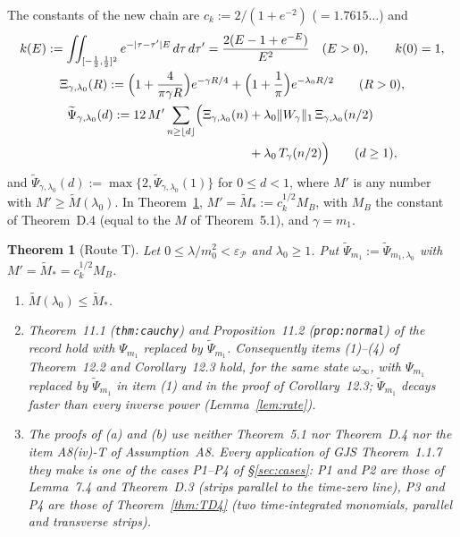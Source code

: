 \documentclass[11pt,a4paper]{article}
\newcommand{\Mt}{\widetilde M}                %
\newcommand{\Psit}{\widetilde\Psi}
\theoremstyle{plain}
\newtheorem{ttheorem}[tlemma]{Theorem}
\theoremstyle{definition}
\begin{document}
The constants of the new chain are $c_k:=2/(1+e^{-2})$ ($=1.7615\ldots$) and
\begin{gather}
 k(E):=\iint_{[-\frac12,\frac12]^2}e^{-|\tau-\tau'|E}\,d\tau\,d\tau'
 =\frac{2(E-1+e^{-E})}{E^2}\quad(E>0),\qquad k(0)=1,\label{eq:k}\\
 \Xi_{\gamma,\lambda_0}(R):=\Bigl(1+\frac{4}{\pi\gamma R}\Bigr)e^{-\gamma R/4}
 +\Bigl(1+\frac1\pi\Bigr)e^{-\lambda_0R/2}\qquad(R>0),\label{eq:Xi}\\
 \begin{split}
 \Psit_{\gamma,\lambda_0}(d):=12\,M'\sum_{n\ge\lfloor d\rfloor}\Bigl(\Xi_{\gamma,\lambda_0}(n)
 &+\lambda_0\|W_\gamma\|_1\,\Xi_{\gamma,\lambda_0}(n/2)\\
 &+\lambda_0\,T_\gamma(n/2)\Bigr)\qquad(d\ge1),
 \end{split}\label{eq:Psit}
\end{gather}
and $\Psit_{\gamma,\lambda_0}(d):=\max\{2,\Psit_{\gamma,\lambda_0}(1)\}$ for $0\le d<1$, where
$M'$ is any number with $M'\ge\Mt(\lambda_0)$.  In Theorem~\ref{thm:routeT},
$M'=\Mt_*:=c_k^{1/2}M_B$, with $M_B$ the constant of Theorem~D.4 (equal to the $M$ of
Theorem~5.1), and $\gamma=m_1$.

\begin{ttheorem}[Route T]\label{thm:routeT}
Let $0\le\lambda/m_0^2<\varepsilon_{\mathscr P}$ and $\lambda_0\ge1$.  Put
$\Psit_{m_1}:=\Psit_{m_1,\lambda_0}$ with $M'=\Mt_*=c_k^{1/2}M_B$.
\begin{enumerate}
\item[\rm(a)] $\Mt(\lambda_0)\le\Mt_*$.
\item[\rm(b)] Theorem~11.1 (\texttt{thm:cauchy}) and Proposition~11.2 (\texttt{prop:normal}) of
the record hold with $\Psi_{m_1}$ replaced by $\Psit_{m_1}$.  Consequently items (1)--(4) of
Theorem~12.2 and Corollary~12.3 hold, for the same state $\omega_\infty$, with $\Psi_{m_1}$
replaced by $\Psit_{m_1}$ in item (1) and in the proof of Corollary~12.3; $\Psit_{m_1}$ decays
faster than every inverse power (Lemma~\ref{lem:rate}).
\item[\rm(c)] The proofs of (a) and (b) use neither Theorem~5.1 nor Theorem~D.4 nor the item
A8(iv)-T of Assumption~A8.  Every application of GJS Theorem~1.1.7 they make is one of the
cases P1--P4 of \S\ref{sec:cases}: P1 and P2 are those of Lemma~7.4 and Theorem~D.3 (strips
parallel to the time-zero line), P3 and P4 are those of Theorem~\ref{thm:TD4} (two
time-integrated monomials, parallel and transverse strips).
\end{enumerate}
\end{ttheorem}
\end{document}
